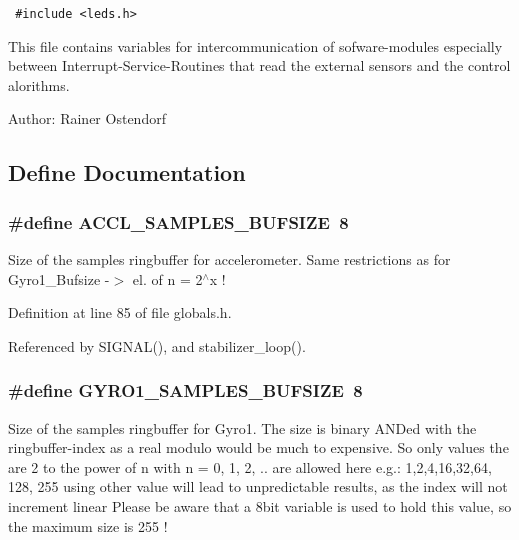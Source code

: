 \begin{Code}\begin{verbatim} #include <leds.h> 
\end{verbatim}\end{Code}



This file contains variables for intercommunication of sofware-modules especially between Interrupt-Service-Routines that read the external sensors and the control alorithms.

\begin{Desc}
\item[Author:]Rainer Ostendorf \end{Desc}


\subsection{Define Documentation}
\subsubsection{\setlength{\rightskip}{0pt plus 5cm}\#define ACCL\_\-SAMPLES\_\-BUFSIZE~8}\label{group__ro__globals_g65722f3de281151a8ad20ab42556f894}


Size of the samples ringbuffer for accelerometer. Same restrictions as for Gyro1\_\-Bufsize -$>$ el. of n = 2$^\wedge$x ! 

Definition at line 85 of file globals.h.

Referenced by SIGNAL(), and stabilizer\_\-loop().
\subsubsection{\setlength{\rightskip}{0pt plus 5cm}\#define GYRO1\_\-SAMPLES\_\-BUFSIZE~8}\label{group__ro__globals_g66385c3be72a1a5ffeb3859aa30af060}


Size of the samples ringbuffer for Gyro1. The size is binary ANDed with the ringbuffer-index as a real modulo would be much to expensive. So only values the are 2 to the power of n with n = 0, 1, 2, .. are allowed here e.g.: 1,2,4,16,32,64, 128, 255 using other value will lead to unpredictable results, as the index will not increment linear Please be aware that a 8bit variable is used to hold this value, so the maximum size is 255 ! 

